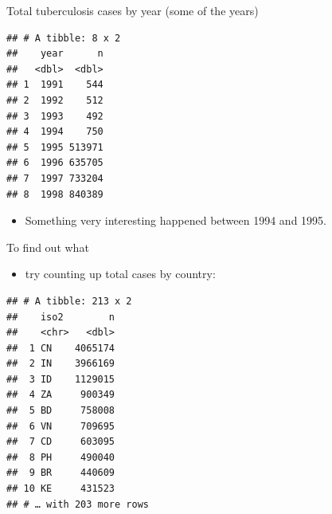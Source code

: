 \documentclass[ignorenonframetext,]{beamer}
\newenvironment{Shaded}{\begin{snugshade}}{\end{snugshade}}
\newcommand{\DataTypeTok}[1]{\textcolor[rgb]{0.13,0.29,0.53}{#1}}
\newcommand{\DecValTok}[1]{\textcolor[rgb]{0.00,0.00,0.81}{#1}}
\newcommand{\KeywordTok}[1]{\textcolor[rgb]{0.13,0.29,0.53}{\textbf{#1}}}
\newcommand{\NormalTok}[1]{#1}
\newcommand{\OperatorTok}[1]{\textcolor[rgb]{0.81,0.36,0.00}{\textbf{#1}}}
\newcommand{\StringTok}[1]{\textcolor[rgb]{0.31,0.60,0.02}{#1}}
\providecommand{\tightlist}{%
  \setlength{\itemsep}{0pt}\setlength{\parskip}{0pt}}
\begin{document}
\begin{frame}[fragile]{Total tuberculosis cases by year (some of the
years)}
\protect\hypertarget{total-tuberculosis-cases-by-year-some-of-the-years}{}

\begin{Shaded}
\end{Shaded}

\begin{verbatim}
## # A tibble: 8 x 2
##    year      n
##   <dbl>  <dbl>
## 1  1991    544
## 2  1992    512
## 3  1993    492
## 4  1994    750
## 5  1995 513971
## 6  1996 635705
## 7  1997 733204
## 8  1998 840389
\end{verbatim}

\begin{itemize}
\tightlist
\item
  Something very interesting happened between 1994 and 1995.
\end{itemize}

\end{frame}

\begin{frame}[fragile]{To find out what}
\protect\hypertarget{to-find-out-what}{}

\begin{itemize}
\tightlist
\item
  try counting up total cases by country:
\end{itemize}

\begin{Shaded}
\end{Shaded}

\begin{verbatim}
## # A tibble: 213 x 2
##    iso2        n
##    <chr>   <dbl>
##  1 CN    4065174
##  2 IN    3966169
##  3 ID    1129015
##  4 ZA     900349
##  5 BD     758008
##  6 VN     709695
##  7 CD     603095
##  8 PH     490040
##  9 BR     440609
## 10 KE     431523
## # … with 203 more rows
\end{verbatim}

\end{frame}
\end{document}

